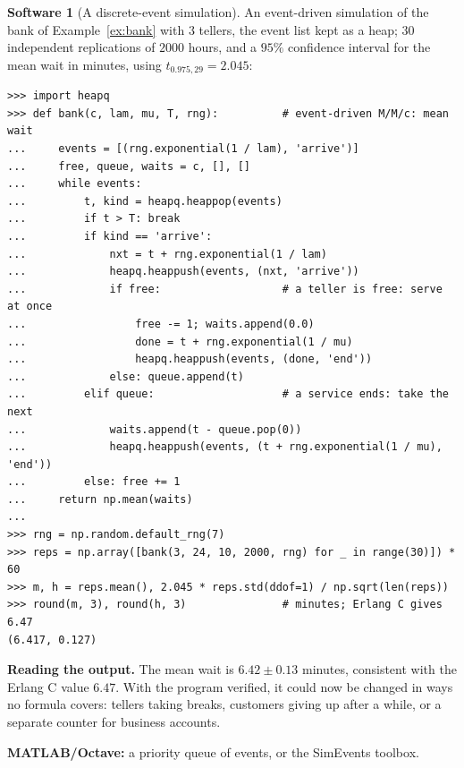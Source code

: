 \documentclass[11pt,a4paper]{article}
\numberwithin{equation}{section}
\theoremstyle{definition}
\newtheorem{software}[thm]{Software}
\begin{document}
\begin{software}[A discrete-event simulation]
\label{sw:des}
An event-driven simulation of the bank of Example~\ref{ex:bank} with $3$ tellers, the event list kept as a heap; $30$ independent replications of $2000$ hours, and a $95\%$ confidence interval for the mean wait in minutes, using $t_{0.975, 29} = 2.045$:
{\small\begin{verbatim}
>>> import heapq
>>> def bank(c, lam, mu, T, rng):          # event-driven M/M/c: mean wait
...     events = [(rng.exponential(1 / lam), 'arrive')]
...     free, queue, waits = c, [], []
...     while events:
...         t, kind = heapq.heappop(events)
...         if t > T: break
...         if kind == 'arrive':
...             nxt = t + rng.exponential(1 / lam)
...             heapq.heappush(events, (nxt, 'arrive'))
...             if free:                   # a teller is free: serve at once
...                 free -= 1; waits.append(0.0)
...                 done = t + rng.exponential(1 / mu)
...                 heapq.heappush(events, (done, 'end'))
...             else: queue.append(t)
...         elif queue:                    # a service ends: take the next
...             waits.append(t - queue.pop(0))
...             heapq.heappush(events, (t + rng.exponential(1 / mu), 'end'))
...         else: free += 1
...     return np.mean(waits)
...
>>> rng = np.random.default_rng(7)
>>> reps = np.array([bank(3, 24, 10, 2000, rng) for _ in range(30)]) * 60
>>> m, h = reps.mean(), 2.045 * reps.std(ddof=1) / np.sqrt(len(reps))
>>> round(m, 3), round(h, 3)               # minutes; Erlang C gives 6.47
(6.417, 0.127)
\end{verbatim}}
\textbf{Reading the output.} The mean wait is $6.42 \pm 0.13$ minutes, consistent with the Erlang C value $6.47$. With the program verified, it could now be changed in ways no formula covers: tellers taking breaks, customers giving up after a while, or a separate counter for business accounts.

\textbf{MATLAB/Octave:} a priority queue of events, or the SimEvents toolbox.
\end{software}
\end{document}
